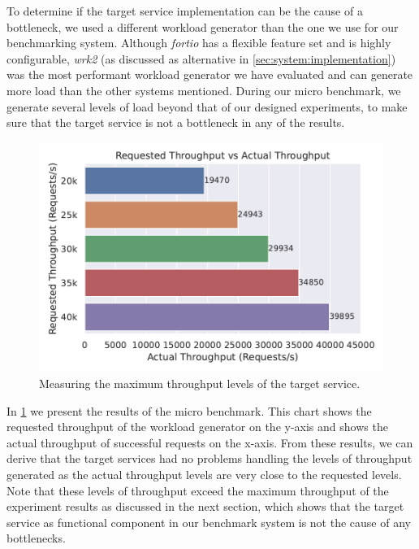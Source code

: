 To determine if the target service implementation can be the cause of a bottleneck, we used a different workload generator than the one we use for our benchmarking system. Although \textit{fortio} has a flexible feature set and is highly configurable, \textit{wrk2} (as discussed as alternative in \cref{sec:system:implementation}) was the most performant workload generator we have evaluated and can generate more load than the other systems mentioned. During our micro benchmark, we generate several levels of load beyond that of our designed experiments, to make sure that the target service is not a bottleneck in any of the results.

\begin{figure}[!t]
    \centering
    
    \includegraphics[width=0.8\linewidth]{5_experimental_evaluation/figures/microbench-target-service.pdf}

    \caption[Micro Benchmark - Measuring the maximum throughput levels of the target service]{Measuring the maximum throughput levels of the target service.}
    
    \label{fig:microbench:target-svc}
\end{figure}

In \cref{fig:microbench:target-svc} we present the results of the micro benchmark. This chart shows the requested throughput of the workload generator on the y-axis and shows the actual throughput of successful requests on the x-axis. From these results, we can derive that the target services had no problems handling the levels of throughput generated as the actual throughput levels are very close to the requested levels. Note that these levels of throughput exceed the maximum throughput of the experiment results as discussed in the next section, which shows that the target service as functional component in our benchmark system is not the cause of any bottlenecks.
